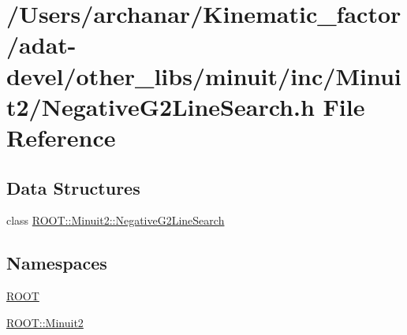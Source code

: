 \hypertarget{adat-devel_2other__libs_2minuit_2inc_2Minuit2_2NegativeG2LineSearch_8h}{}\section{/\+Users/archanar/\+Kinematic\+\_\+factor/adat-\/devel/other\+\_\+libs/minuit/inc/\+Minuit2/\+Negative\+G2\+Line\+Search.h File Reference}
\label{adat-devel_2other__libs_2minuit_2inc_2Minuit2_2NegativeG2LineSearch_8h}
\subsection*{Data Structures}
\begin{DoxyCompactItemize}
\item 
class \mbox{\hyperlink{classROOT_1_1Minuit2_1_1NegativeG2LineSearch}{R\+O\+O\+T\+::\+Minuit2\+::\+Negative\+G2\+Line\+Search}}
\end{DoxyCompactItemize}
\subsection*{Namespaces}
\begin{DoxyCompactItemize}
\item 
 \mbox{\hyperlink{namespaceROOT}{R\+O\+OT}}
\item 
 \mbox{\hyperlink{namespaceROOT_1_1Minuit2}{R\+O\+O\+T\+::\+Minuit2}}
\end{DoxyCompactItemize}
